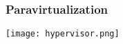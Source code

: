 \begin{frame}
\frametitle{Paravirtualization}
    \center\texttt{[image: hypervisor.png]}
\end{frame}
